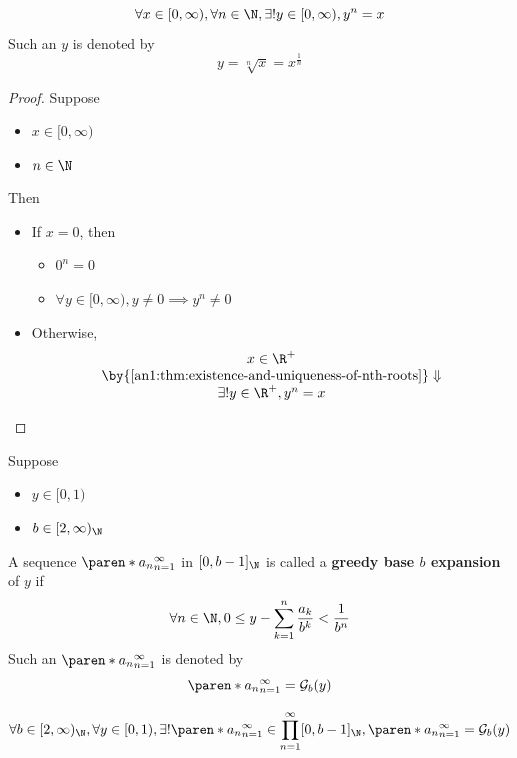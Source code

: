\begin{corollary} \label{an1:cor:existence-and-uniqueness-of-nth-roots}
  \[
    \forall x \in [0, \infty), \forall n \in \N, \exists! y \in [0, \infty), y^{n} = x
  \]
  Such an $y$ is denoted by
  \[
    y = \sqrt[n]{x} = x^{\frac{1}{n}}
  \]
\end{corollary}

\begin{proof}
  Suppose
  \begin{itemize}
    \item $x \in [0, \infty)$
    \item $n \in \N$
  \end{itemize}
  Then
  \begin{itemize}
    \item If $x = 0$, then
          \begin{itemize}
            \item $0^{n} = 0$
            \item $\forall y \in [0, \infty), y \neq 0 \implies y^{n} \neq 0$
          \end{itemize}
    \item Otherwise,
          \[
            \begin{array}{c}
              x \in \R^{+}                                                         \\
              \by{\Cref{an1:thm:existence-and-uniqueness-of-nth-roots}} \Downarrow \\
              \exists! y \in \R^{+}, y^{n} = x
            \end{array}
          \]
  \end{itemize}
\end{proof}

\begin{definition} \label{an1:def:greedy-base-expansion}
  Suppose
  \begin{itemize}
    \item $y \in [0, 1)$
    \item $b \in [2, \infty)_{\N}$
  \end{itemize}
  A sequence $\paren*{a_{n}}_{n = 1}^{\infty}$ in $[0, b - 1]_{\N}$ is called a \textbf{greedy base $b$ expansion} of $y$ if
  \[
    \forall n \in \N, 0 \leq y - \sum_{k = 1}^{n} \frac{a_{k}}{b^{k}} < \frac{1}{b^{n}}
  \]
  Such an $\paren*{a_{n}}_{n = 1}^{\infty}$ is denoted by
  \[
    \paren*{a_{n}}_{n = 1}^{\infty} = \mathcal{G}_{b}(y)
  \]
\end{definition}

\begin{theorem} \label{an1:thm:greedy-base-expansion-exists-uniquely}
  \[
    \forall b \in [2, \infty)_{\N}, \forall y \in [0, 1), \exists! \paren*{a_{n}}_{n = 1}^{\infty}
    \in \prod_{n = 1}^{\infty} [0, b - 1]_{\N}, \paren*{a_{n}}_{n = 1}^{\infty} = \mathcal{G}_{b}(y)
  \]
\end{theorem}
